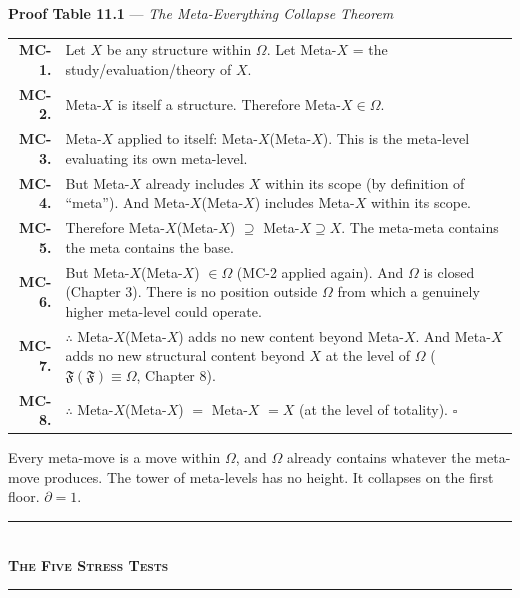 \documentclass[10pt, openany, oneside]{book}
\renewcommand{\normalsize}{\fontsize{10}{13}\selectfont}
\renewcommand{\footnotesize}{\fontsize{8.5}{11}\selectfont}
\begin{document}
\textbf{Proof Table 11.1} --- \textit{The Meta-Everything Collapse Theorem}

\vspace{0.5em}

{\footnotesize
\noindent\begin{tabular}{r p{}}
\textbf{MC-1.} & Let $X$ be any structure within $\Omega$. Let Meta-$X$ = the study/evaluation/theory of $X$. \\[0.3em]
\textbf{MC-2.} & Meta-$X$ is itself a structure. Therefore Meta-$X \in \Omega$. \\[0.3em]
\textbf{MC-3.} & Meta-$X$ applied to itself: Meta-$X$(Meta-$X$). This is the meta-level evaluating its own meta-level. \\[0.3em]
\textbf{MC-4.} & But Meta-$X$ already includes $X$ within its scope (by definition of ``meta''). And Meta-$X$(Meta-$X$) includes Meta-$X$ within its scope. \\[0.3em]
\textbf{MC-5.} & Therefore Meta-$X$(Meta-$X$) $\supseteq$ Meta-$X \supseteq X$. The meta-meta contains the meta contains the base. \\[0.3em]
\textbf{MC-6.} & But Meta-$X$(Meta-$X$) $\in \Omega$ (MC-2 applied again). And $\Omega$ is closed (Chapter 3). There is no position outside $\Omega$ from which a genuinely higher meta-level could operate. \\[0.3em]
\textbf{MC-7.} & $\therefore$ Meta-$X$(Meta-$X$) adds no new content beyond Meta-$X$. And Meta-$X$ adds no new structural content beyond $X$ at the level of $\Omega$ ($\mathfrak{F}(\mathfrak{F}) \equiv \Omega$, Chapter 8). \\[0.3em]
\textbf{MC-8.} & $\therefore$ Meta-$X$(Meta-$X$) $=$ Meta-$X$ $= X$ (at the level of totality). $\square$ \\[0.3em]
\end{tabular}
}

\vspace{0.8em}

\noindent Every meta-move is a move within $\Omega$, and $\Omega$ already contains whatever the meta-move produces. The tower of meta-levels has no height. It collapses on the first floor. $\partial = 1$.

\vspace{1.5em}


\begin{center}
    \rule{0.3\textwidth}{0.4pt}\\[0.5em]
    {\normalsize\bfseries\scshape The Five Stress Tests}\\[0.3em]
    \rule{0.3\textwidth}{0.4pt}
\end{center}
\end{document}
